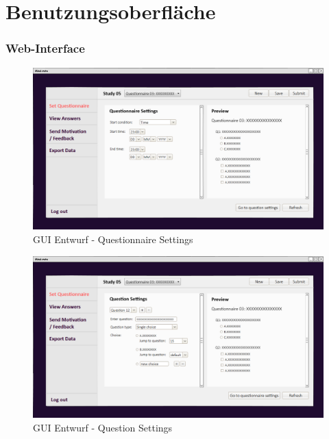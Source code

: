\documentclass[a4paper]{scrreprt}
\begin{document}
    \chapter{Benutzungsoberfläche}
        \subsection{Web-Interface}
            \begin{figure}[ht]
                \centering
                \includegraphics[scale = 0.25]{web_set1.png}
                \caption{GUI Entwurf - Questionnaire Settings}
            \end{figure}

	        \begin{figure}[ht]
	        	\centering
	        	\includegraphics[scale = 0.25]{web_set2.png}
	        	\caption{GUI Entwurf - Question Settings}
	        \end{figure}
\end{document}
